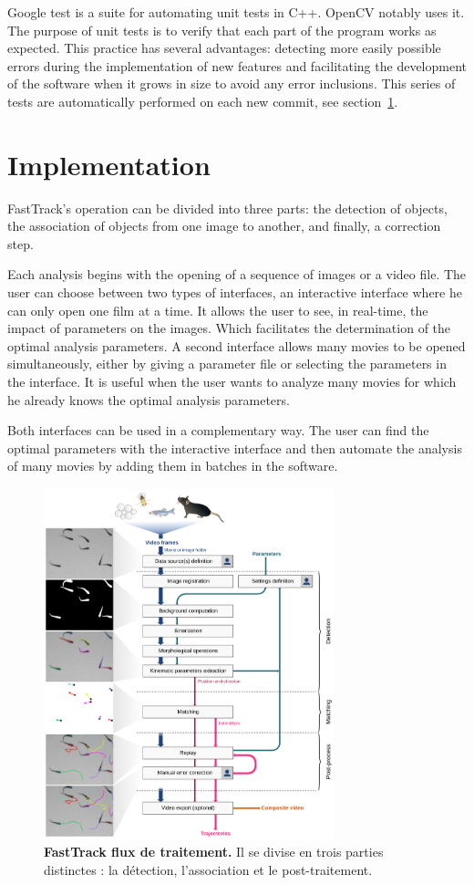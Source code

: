 	Google test is a suite for automating unit tests in C++. OpenCV notably uses it. The purpose of unit tests is to verify that each part of the program works as expected. This practice has several advantages: detecting more easily possible errors during the implementation of new features and facilitating the development of the software when it grows in size to avoid any error inclusions. This series of tests are automatically performed on each new commit, see section~\ref{}.

	\section{Implementation}
	FastTrack's operation can be divided into three parts: the detection of objects, the association of objects from one image to another, and finally, a correction step.

	Each analysis begins with the opening of a sequence of images or a video file. The user can choose between two types of interfaces, an interactive interface where he can only open one film at a time. It allows the user to see, in real-time, the impact of parameters on the images. Which facilitates the determination of the optimal analysis parameters. A second interface allows many movies to be opened simultaneously, either by giving a parameter file or selecting the parameters in the interface. It is useful when the user wants to analyze many movies for which he already knows the optimal analysis parameters.

	Both interfaces can be used in a complementary way. The user can find the optimal parameters with the interactive interface and then automate the analysis of many movies by adding them in batches in the software.


	\begin{figure}[h!]
    \centering
    \includegraphics[width=0.75\textwidth]{part_1/assets/Figure_1.png}    
    \caption{\textbf{FastTrack flux de traitement.} Il se divise en trois parties distinctes : la détection, l'association et le post-traitement.}
    \label{part_1:fig_1}
    \end{figure}
	

